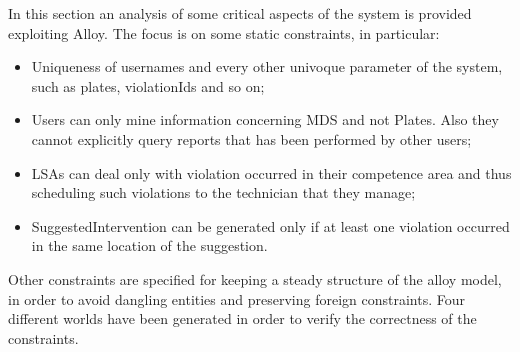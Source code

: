 In this	section an analysis of some critical aspects of the system is provided exploiting Alloy.	
The	focus is on	some static	constraints, in	particular:	
\begin{itemize}
    \item Uniqueness of usernames and every other univoque parameter of the system, such as plates, violationIds and so on;
    \item Users can only mine information concerning MDS and not Plates. Also they cannot explicitly query reports that has been performed by other users;
    \item LSAs can deal only with violation occurred in their competence area and thus scheduling such violations to the technician that they manage;
    \item SuggestedIntervention can be generated only if at least one violation occurred in the same location of the suggestion.
\end{itemize}
Other constraints are specified for keeping a steady structure of the alloy model, in order to avoid dangling entities and preserving foreign constraints.\newline
Four different worlds have been generated in order to verify the correctness of the constraints.
